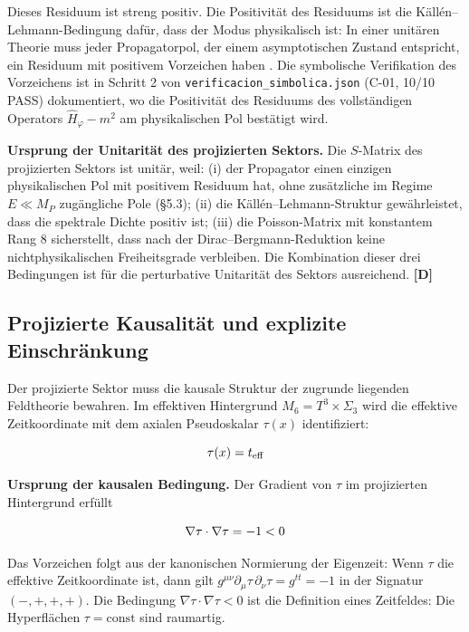 ﻿\documentclass[11pt,letterpaper]{article}
\begin{document}
Dieses Residuum ist streng positiv. Die Positivität des Residuums ist die Källén--Lehmann-Bedingung dafür, dass der Modus physikalisch ist: In einer unitären Theorie muss jeder Propagatorpol, der einem asymptotischen Zustand entspricht, ein Residuum mit positivem Vorzeichen haben \cite{Kallen1952,Lehmann1954}. Die symbolische Verifikation des Vorzeichens ist in Schritt 2 von \texttt{verificacion\_simbolica.json} (C-01, 10/10 PASS) dokumentiert, wo die Positivität des Residuums des vollständigen Operators $\hat{H}_\varphi - m^2$ am physikalischen Pol bestätigt wird.

\textbf{Ursprung der Unitarität des projizierten Sektors.} Die $S$-Matrix des projizierten Sektors ist unitär, weil: (i) der Propagator einen einzigen physikalischen Pol mit positivem Residuum hat, ohne zusätzliche im Regime $E \ll M_P$ zugängliche Pole (§5.3); (ii) die Källén--Lehmann-Struktur gewährleistet, dass die spektrale Dichte positiv ist; (iii) die Poisson-Matrix mit konstantem Rang $8$ sicherstellt, dass nach der Dirac--Bergmann-Reduktion keine nichtphysikalischen Freiheitsgrade verbleiben. Die Kombination dieser drei Bedingungen ist für die perturbative Unitarität des Sektors ausreichend. \textbf{[D]}
\subsection{Projizierte Kausalität und explizite Einschränkung}
Der projizierte Sektor muss die kausale Struktur der zugrunde liegenden Feldtheorie bewahren. Im effektiven Hintergrund $M_6 = T^3 \times \Sigma_3$ wird die effektive Zeitkoordinate mit dem axialen Pseudoskalar $\tau(x)$ identifiziert:

\begin{equation*}
  \resizebox{\ifdim\width>\linewidth \linewidth\else\width\fi}{!}{$\displaystyle \tau(x) = t_{\text{eff}}$}
\end{equation*}

\textbf{Ursprung der kausalen Bedingung.} Der Gradient von $\tau$ im projizierten Hintergrund erfüllt

\begin{equation*}
  \resizebox{\ifdim\width>\linewidth \linewidth\else\width\fi}{!}{$\displaystyle \nabla\tau \cdot \nabla\tau = -1 < 0$}
\end{equation*}

Das Vorzeichen folgt aus der kanonischen Normierung der Eigenzeit: Wenn $\tau$ die effektive Zeitkoordinate ist, dann gilt $g^{\mu\nu}\partial_\mu\tau\,\partial_\nu\tau = g^{tt} = -1$ in der Signatur $(-,+,+,+)$. Die Bedingung $\nabla\tau \cdot \nabla\tau < 0$ ist die Definition eines Zeitfeldes: Die Hyperflächen $\tau = \text{const}$ sind raumartig.
\end{document}
